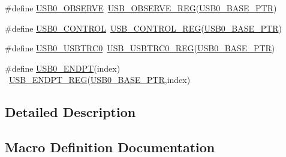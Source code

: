 \begin{DoxyCompactItemize}
\item 
\#define \hyperlink{group___u_s_b___register___accessor___macros_gae7fc760132c134248d833d94ec89635e}{U\+S\+B0\+\_\+\+O\+B\+S\+E\+R\+VE}~\hyperlink{group___u_s_b___register___accessor___macros_ga2ee1aa6fd76b49402bf4a1799687e944}{U\+S\+B\+\_\+\+O\+B\+S\+E\+R\+V\+E\+\_\+\+R\+EG}(\hyperlink{group___u_s_b___peripheral_ga598ff5eb20a0551af232710b3f27640a}{U\+S\+B0\+\_\+\+B\+A\+S\+E\+\_\+\+P\+TR})
\item 
\#define \hyperlink{group___u_s_b___register___accessor___macros_gaf00c1bd9c15954db30472d3273cf7ec2}{U\+S\+B0\+\_\+\+C\+O\+N\+T\+R\+OL}~\hyperlink{group___u_s_b___register___accessor___macros_ga9c4c4c5d0d19933e8c0ab5ac5dfe48a5}{U\+S\+B\+\_\+\+C\+O\+N\+T\+R\+O\+L\+\_\+\+R\+EG}(\hyperlink{group___u_s_b___peripheral_ga598ff5eb20a0551af232710b3f27640a}{U\+S\+B0\+\_\+\+B\+A\+S\+E\+\_\+\+P\+TR})
\item 
\#define \hyperlink{group___u_s_b___register___accessor___macros_ga05ec0dc133dcc7675dda9e96c6ed222b}{U\+S\+B0\+\_\+\+U\+S\+B\+T\+R\+C0}~\hyperlink{group___u_s_b___register___accessor___macros_gaf054f3a4251da894e8431bb28eceaa6e}{U\+S\+B\+\_\+\+U\+S\+B\+T\+R\+C0\+\_\+\+R\+EG}(\hyperlink{group___u_s_b___peripheral_ga598ff5eb20a0551af232710b3f27640a}{U\+S\+B0\+\_\+\+B\+A\+S\+E\+\_\+\+P\+TR})
\item 
\#define \hyperlink{group___u_s_b___register___accessor___macros_gab618a89bd493abe85e2d995d914a0706}{U\+S\+B0\+\_\+\+E\+N\+D\+PT}(index)                                            ~\hyperlink{group___u_s_b___register___accessor___macros_ga2d64e95d192db6bf8f035cc6a7cf48d6}{U\+S\+B\+\_\+\+E\+N\+D\+P\+T\+\_\+\+R\+EG}(\hyperlink{group___u_s_b___peripheral_ga598ff5eb20a0551af232710b3f27640a}{U\+S\+B0\+\_\+\+B\+A\+S\+E\+\_\+\+P\+TR},index)
\end{DoxyCompactItemize}


\subsection{Detailed Description}


\subsection{Macro Definition Documentation}
